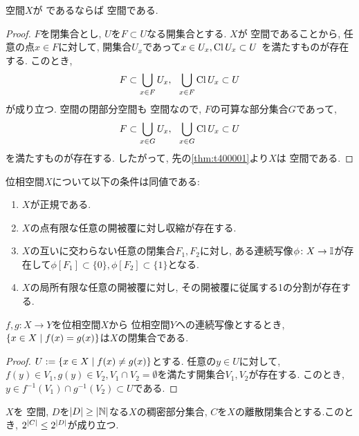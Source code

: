 \documentclass[uplatex, dvipdfmx, a4paper, 12pt, class=jsbook, crop=false]{standalone}
\begin{document}
\begin{theorem}
	 空間\( X \)が \Lindelof であるならば  空間である.
\end{theorem}

\begin{proof}
	\( F \)を閉集合とし, \( U \)を\( F \subset U \)なる開集合とする.
	\( X \)が  空間であることから,
	任意の点\( x \in F \)に対して,
	開集合\( U_x \)であって\( x \in U_x, \mathop{\mathrm{Cl}}\nolimits U_x \subset U \)
	を満たすものが存在する. このとき,
	\[ F \subset \bigcup_{x \in F} U_x,
	\ \ \bigcup_{x \in F} \mathop{\mathrm{Cl}}\nolimits U_x \subset U \]
	が成り立つ. \Lindelof 空間の閉部分空間も \Lindelof 空間なので,
	\( F \)の可算な部分集合\( G \)であって,
	\[  F \subset \bigcup_{x \in G} U_x,
	\ \ \bigcup_{x \in G} \mathop{\mathrm{Cl}}\nolimits U_x \subset U \]
	を満たすものが存在する.
	したがって, 先の\cref{thm:t400001}より\( X \)は  空間である.
\end{proof}

\begin{theorem}
	位相空間$ X $について以下の条件は同値である:
	\begin{enumerate}
		\item $ X $が正規である.
		\item $ X $の点有限な任意の開被覆に対し収縮が存在する.
		\item  $ X $の互いに交わらない任意の閉集合$ F_1, F_2 $に対し, ある連続写像$ \phi \colon X \rightarrow \mathbb{I} $が存在して$ \phi[F_1] \subset \{0\}, \phi[F_2] \subset \{1\} $となる.
		\item $ X $の局所有限な任意の開被覆に対し, その開被覆に従属する1の分割が存在する.
	\end{enumerate}
\end{theorem}

\begin{lemma}
	\label{lem:Let X and Y are top.sp, Y is T2, f,g : X to Y are conti, then the set defined as {x in X | f(x) = g(x)} is closed.}
	$f, g \colon X \to Y $を位相空間$ X $から  位相空間$ Y $への連続写像とするとき, $ \setcomp{x \in X}{f(x) = g(x)} $は$ X $の閉集合である.
\end{lemma}

\begin{proof}
	$ U \defeq \setcomp{x \in X}{f(x) \neq g(x)} $とする. 任意の$ y \in U $に対して, $ f(y) \in V_1, g(y) \in V_2, V_1 \cap V_2 = \emptyset $を満たす開集合$ V_1, V_2 $が存在する. このとき, $ y \in f^{-1}(V_1) \cap g^{-1}(V_2) \subset U $である.
\end{proof}

\begin{theorem}
	\label{thm:Jone's Lemma}
	$ X $を  空間, $ D $を$ \left|D\right| \geq \left|\mathbb{N}\right| $なる$ X $の稠密部分集合, $ C $を$ X $の離散閉集合とする.このとき, $2^{\left|C\right|} \leq 2^{\left|D\right|} $が成り立つ.
\end{theorem}
\end{document}
